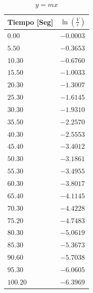 \documentclass[twocolumn, 12pt]{article}
\begin{document}
\begin{table}[H]
    \centering
    \begin{tabularx}{0.9\linewidth}{|>{\centering\arraybackslash}X|>{\centering\arraybackslash}X|}

        \hline
        Tiempo \textbf{[Seg]} & $\ln(\frac{V}{\varepsilon})$ \\\hline
        $0.00$                & $-0.0003$                    \\\hline
        $5.50$                & $-0.3653$                    \\\hline
        $10.30$               & $-0.6760$                    \\\hline
        $15.50$               & $-1.0033$                    \\\hline
        $20.30$               & $-1.3007$                    \\\hline
        $25.30$               & $-1.6145$                    \\\hline
        $30.30$               & $-1.9310$                    \\\hline
        $35.50$               & $-2.2570$                    \\\hline
        $40.30$               & $-2.5553$                    \\\hline
        $45.40$               & $-3.4012$                    \\\hline
        $50.30$               & $-3.1861$                    \\\hline
        $55.30$               & $-3.4955$                    \\\hline
        $60.30$               & $-3.8017$                    \\\hline
        $65.40$               & $-4.1145$                    \\\hline
        $70.30$               & $-4.4228$                    \\\hline
        $75.20$               & $-4.7483$                    \\\hline
        $80.30$               & $-5.0619$                    \\\hline
        $85.30$               & $-5.3673$                    \\\hline
        $90.60$               & $-5.7038$                    \\\hline
        $95.30$               & $-6.0605$                    \\\hline
        $100.20$              & $-6.3969$                    \\\hline
    \end{tabularx}

    \caption{$y = mx$}
    \label{tab:yEqualsMX__Descarga}
\end{table}
\end{document}
